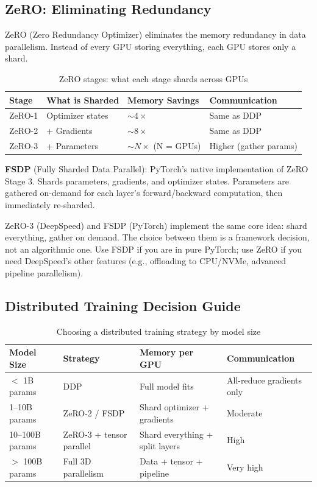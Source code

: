 \subsection{ZeRO: Eliminating Redundancy}

ZeRO (Zero Redundancy Optimizer) eliminates the memory redundancy in data parallelism. Instead of every GPU storing everything, each GPU stores only a shard.

\begin{table}[H]
\centering
\caption{ZeRO stages: what each stage shards across GPUs}
\begin{tabularx}{\textwidth}{lXXl}
\toprule
\textbf{Stage} & \textbf{What is Sharded} & \textbf{Memory Savings} & \textbf{Communication} \\
\midrule
ZeRO-1 & Optimizer states & $\sim 4\times$ & Same as DDP \\
ZeRO-2 & + Gradients & $\sim 8\times$ & Same as DDP \\
ZeRO-3 & + Parameters & $\sim N\times$ (N = GPUs) & Higher (gather params) \\
\bottomrule
\end{tabularx}
\end{table}

\textbf{FSDP} (Fully Sharded Data Parallel): PyTorch's native implementation of ZeRO Stage 3. Shards parameters, gradients, and optimizer states. Parameters are gathered on-demand for each layer's forward/backward computation, then immediately re-sharded.

\begin{keyinsight}
ZeRO-3 (DeepSpeed) and FSDP (PyTorch) implement the same core idea: shard everything, gather on demand. The choice between them is a framework decision, not an algorithmic one. Use FSDP if you are in pure PyTorch; use ZeRO if you need DeepSpeed's other features (e.g., offloading to CPU/NVMe, advanced pipeline parallelism).
\end{keyinsight}

\subsection{Distributed Training Decision Guide}

\begin{table}[H]
\centering
\caption{Choosing a distributed training strategy by model size}
\begin{tabularx}{\textwidth}{lXXX}
\toprule
\textbf{Model Size} & \textbf{Strategy} & \textbf{Memory per GPU} & \textbf{Communication} \\
\midrule
$<$ 1B params & DDP & Full model fits & All-reduce gradients only \\
1--10B params & ZeRO-2 / FSDP & Shard optimizer + gradients & Moderate \\
10--100B params & ZeRO-3 + tensor parallel & Shard everything + split layers & High \\
$>$ 100B params & Full 3D parallelism & Data + tensor + pipeline & Very high \\
\bottomrule
\end{tabularx}
\end{table}

